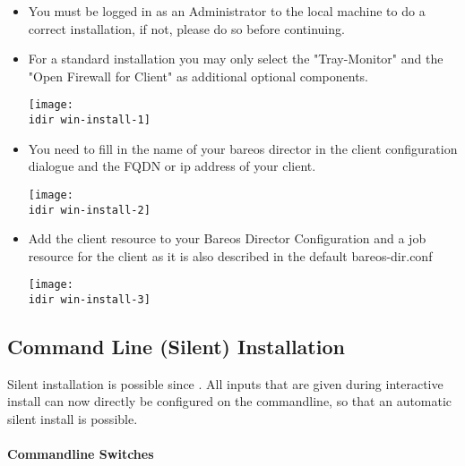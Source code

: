 \begin{itemize}
    \item You must be logged in as an Administrator to the local machine
    to do a correct installation, if not, please do so before continuing.
    \item For a standard installation you may only select the "Tray-Monitor"
    and the "Open Firewall for Client" as additional optional components.
    \begin{center}
    \texttt{[image: \\idir win-install-1]}
    \end{center}

    \item You need to fill in the name of your bareos director in the client configuration
    dialogue and the FQDN or ip address of your client.
    \begin{center}
    \texttt{[image: \\idir win-install-2]}
    \end{center}

    \item Add the client resource to your Bareos Director Configuration and a
    job resource for the client as it is also described in the default bareos-dir.conf
    \begin{center}
    \texttt{[image: \\idir win-install-3]}
    \end{center}
\end{itemize}

\subsection{Command Line (Silent) Installation}

Silent installation is possible since .
All inputs that are given during interactive install can now directly be configured on the
commandline, so that an automatic silent install is possible.

\paragraph{Commandline Switches}

